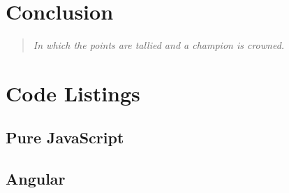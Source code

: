 \documentclass[12pt,letterpaper]{article}
\begin{document}
\section{Conclusion}
\vspace{-12pt}

\begin{quote}
	\singlespacing
	\emph{In which the points are tallied and a champion is crowned.}
\end{quote}










\newpage

\appendix
\section{Code Listings}
\label{app:code}

\subsection*{Pure JavaScript}




\newpage

\subsection*{Angular}



\end{document}

